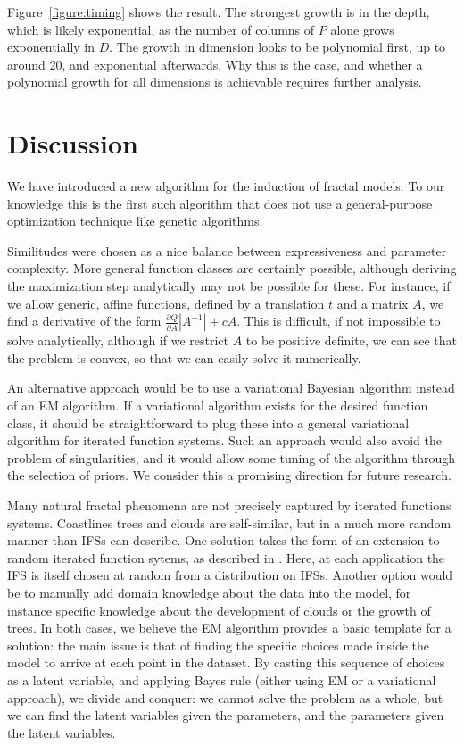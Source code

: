 
Figure~\ref{figure:timing} shows the result. The strongest growth is in the depth, which is likely exponential, as the number of columns of $P$ alone grows exponentially in $D$. The growth in dimension looks to be polynomial first, up to around 20, and exponential afterwards. Why this is the case, and whether a polynomial growth for all dimensions is achievable requires further analysis.

\section{Discussion}

We have introduced a new algorithm for the induction of fractal models. To our knowledge this is the first such algorithm that does not use a general-purpose optimization technique like genetic algorithms. 

Similitudes were chosen as a nice balance between expressiveness and parameter complexity. More general function classes are certainly possible, although deriving the maximization step analytically may not be possible for these. For instance, if we allow generic, affine  functions, defined by a translation $t$ and a matrix $A$, we find a derivative of the form $\frac{\partial Q}{\partial A} |A^{-1}| + cA$. This is difficult, if not impossible to solve analytically, although if we restrict $A$ to be positive definite, we can see that the problem is convex, so that we can easily solve it numerically.

An alternative approach would be to use a variational Bayesian algorithm instead of an EM algorithm. If a variational algorithm exists for the desired function class, it should be straightforward to plug these into a general variational algorithm for iterated function systems. Such an approach would also avoid the problem of singularities, and it would allow some tuning of the algorithm through the selection of priors. We consider this a promising direction for future research.

Many natural fractal phenomena are not precisely captured by iterated functions systems. Coastlines trees and clouds are self-similar, but in a much more random manner than IFSs can describe. One solution takes the form of an extension to random iterated function sytems, as described in \cite{hart1996fractal}. Here, at each application the IFS is itself chosen at random from a distribution on IFSs. Another option would be to manually add domain knowledge about the data into the model, for instance specific knowledge about the development of clouds or the growth of trees. In both cases, we believe the EM algorithm provides a basic template for a solution: the main issue is that of finding the specific choices made inside the model to arrive at each point in the dataset. By casting this sequence of choices as a latent variable, and applying Bayes rule (either using EM or a variational approach), we divide and conquer: we cannot solve the problem as a whole, but we can find the latent variables given the parameters, and the parameters given the latent variables.


